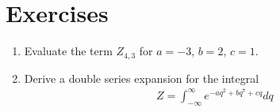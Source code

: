 \documentclass[book.tex]{subfiles}
\begin{document}

\section{Exercises}
\begin{enumerate}
    
\item Evaluate the term $Z_{4, 3}$ for $a=-3$, $b=2$, $c=1$.
\item Derive a double series expansion for the integral 
\begin{align}
    Z = \int_{-\infty}^{\infty} e^{-aq^2 + bq^7 + cq} dq
\end{align}
\end{enumerate}
\end{document}

